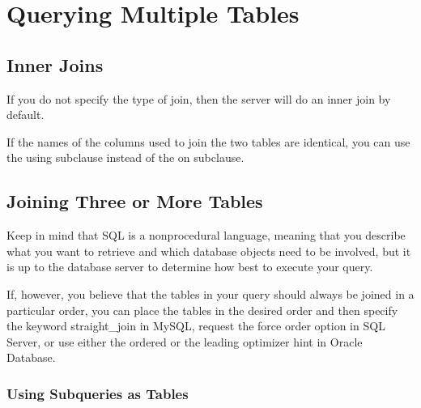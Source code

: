\chapter{Querying Multiple Tables\label{Ch05}}
\section{Inner Joins}
If you do not specify the type of join, then the server will do an inner join by default.

If the names of the columns used to join the two tables are identical, you can use the using subclause instead of the on subclause.
\section{Joining Three or More Tables}

\begin{tcolorbox}[title=Does Join Order Matter?]
    Keep in mind that SQL is a nonprocedural language, meaning that you describe what you want to retrieve and which database objects need to be involved, but it is up to the database server to determine how best to execute your query.

    If, however, you believe that the tables in your query should always be joined in a particular order, you can place the tables in the desired order and then specify the keyword straight\_join in MySQL, request the force order option in SQL Server, or use either the ordered or the leading optimizer hint in Oracle Database.
\end{tcolorbox}

\subsection{Using Subqueries as Tables}
